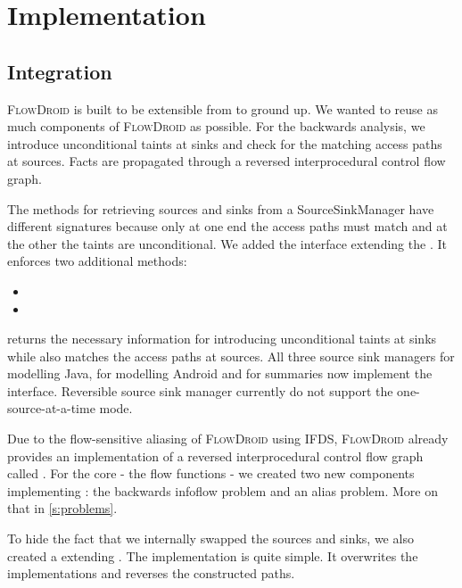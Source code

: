 \documentclass[../draft.tex]{subfiles}
\begin{document}
    \chapter{Implementation}

    \section{Integration}
    \textsc{FlowDroid} is built to be extensible from to ground up. We wanted to reuse as much components of \textsc{FlowDroid} as possible. For the backwards analysis, we introduce unconditional taints at sinks and check for the matching access paths at sources. Facts are propagated through a reversed interprocedural control flow graph.

    The methods for retrieving sources and sinks from a SourceSinkManager have different signatures because only at one end the access paths must match and at the other the taints are unconditional. 
    We added the interface  extending the . It enforces two additional methods:
    \begin{itemize}
        \item {}
        \item {}
    \end{itemize}
     returns the necessary information for introducing unconditional taints at sinks while  also matches the access paths at sources.
    All three source sink managers  for modelling Java,  for modelling Android and  for summaries now implement the  interface.
    Reversible source sink manager currently do not support the one-source-at-a-time mode.

    Due to the flow-sensitive aliasing of \textsc{FlowDroid} using IFDS, \textsc{FlowDroid} already provides an implementation of a reversed interprocedural control flow graph called .
    For the core - the flow functions - we created two new components implementing : the backwards infoflow problem and an alias problem. More on that in \autoref{s:problems}.

    To hide the fact that we internally swapped the sources and sinks, we also created a  extending . The implementation is quite simple. It overwrites the  implementations and reverses the constructed paths.
\end{document}
